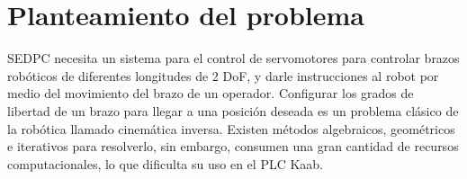 \section{Planteamiento del problema}

SEDPC necesita un sistema para el control de servomotores para controlar brazos robóticos de diferentes longitudes de 2 DoF, y darle instrucciones al robot por medio del movimiento del brazo de un operador.
\newline\newline\newline
Configurar los grados de libertad de un brazo para llegar a una posición deseada es un problema clásico de la robótica llamado cinemática inversa. Existen métodos algebraicos, geométricos e iterativos para resolverlo, sin embargo, consumen una gran cantidad de recursos computacionales, lo que dificulta su uso en el PLC Kaab.